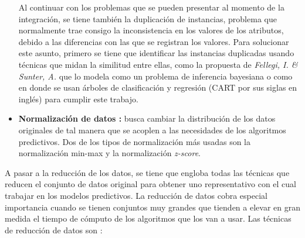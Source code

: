\begin{itemize}
Al continuar con los problemas que se pueden presentar al momento de la integración, se tiene también la duplicación de instancias, problema que normalmente trae consigo la inconsistencia en los valores de los atributos, debido a las diferencias con las que se registran los valores. Para solucionar este asunto, primero se tiene que identificar las instancias duplicadas usando técnicas que midan la similitud entre ellas, como la propuesta de \emph{Fellegi, I. \& Sunter, A.} \cite{fellegi1969theory} que lo modela como un problema de inferencia bayesiana o como en \cite{cochinwala2001efficient} donde se usan árboles de clasificación y regresión (CART por sus siglas en inglés) para cumplir este trabajo.

\item \textbf{Normalización de datos \cite{garcia2016data}:}
busca cambiar la distribución de los datos originales de tal manera que se acoplen a las necesidades de los algoritmos predictivos. Dos de los tipos de normalización más usadas son la normalización min-max y la normalización \emph{z-score}.

\end{itemize}

A pasar a la reducción de los datos, se tiene que engloba todas las técnicas que reducen el conjunto de datos original para obtener uno representativo con el cual trabajar en los modelos predictivos. La reducción de datos cobra especial importancia cuando se tienen conjuntos muy grandes que tienden a elevar en gran medida el tiempo de cómputo de los algoritmos que los van a usar. Las técnicas de reducción de datos son \cite{garcia2016data}:

